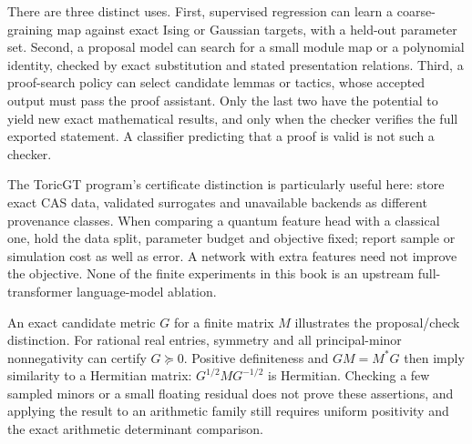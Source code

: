 \documentclass[11pt,oneside,openany]{book}
\theoremstyle{definition}\newtheorem{definition}[theorem]{Definition}
\theoremstyle{remark}\newtheorem{remark}[theorem]{Remark}
\begin{document}
\begin{center}
\end{center}

There are three distinct uses. First, supervised regression can learn a
coarse-graining map against exact Ising or Gaussian targets, with a held-out
parameter set. Second, a proposal model can search for a small module map
or a polynomial identity, checked by exact substitution and stated
presentation relations. Third, a proof-search policy can select candidate
lemmas or tactics, whose accepted output must pass the proof assistant.
Only the last two have the potential to yield new exact mathematical
results, and only when the checker verifies the full exported statement.
A classifier predicting that a proof is valid is not such a checker.

The ToricGT program's certificate distinction is particularly useful here:
store exact CAS data, validated surrogates and unavailable backends as
different provenance classes. When comparing a quantum feature head with
a classical one, hold the data split, parameter budget and objective fixed;
report sample or simulation cost as well as error. A network with extra
features need not improve the objective. None of the finite experiments
in this book is an upstream full-transformer language-model ablation.

An exact candidate metric $G$ for a finite matrix $M$ illustrates the
proposal/check distinction. For rational real entries, symmetry and all
principal-minor nonnegativity can certify $G\succeq0$. Positive
definiteness and $GM=M^*G$ then imply similarity to a Hermitian matrix:
$G^{1/2}MG^{-1/2}$ is Hermitian. Checking a few sampled minors or a small
floating residual does not prove these assertions, and applying the result
to an arithmetic family still requires uniform positivity and the exact
arithmetic determinant comparison.
\end{document}
